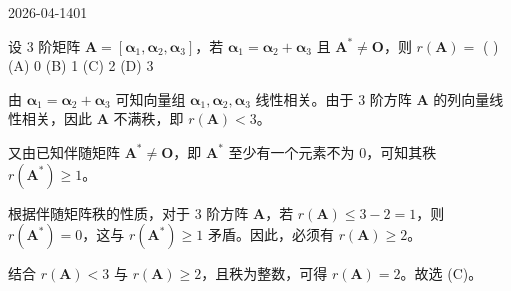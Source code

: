 \begin{mistake}{2026-04-14}{01}

\begin{problemcontent}
设 3 阶矩阵 \(\mathbf{A} = [\boldsymbol{\alpha}_1, \boldsymbol{\alpha}_2, \boldsymbol{\alpha}_3]\)，若 \(\boldsymbol{\alpha}_1 = \boldsymbol{\alpha}_2 + \boldsymbol{\alpha}_3\) 且 \(\mathbf{A}^* \neq \mathbf{O}\)，则 \(r(\mathbf{A}) =\) ( \quad )\\
(A) 0 \qquad (B) 1 \qquad (C) 2 \qquad (D) 3
\end{problemcontent}

\begin{solutioncontent}
由 \(\boldsymbol{\alpha}_1 = \boldsymbol{\alpha}_2 + \boldsymbol{\alpha}_3\) 可知向量组 \(\boldsymbol{\alpha}_1, \boldsymbol{\alpha}_2, \boldsymbol{\alpha}_3\) 线性相关。由于 3 阶方阵 \(\mathbf{A}\) 的列向量线性相关，因此 \(\mathbf{A}\) 不满秩，即 \(r(\mathbf{A}) < 3\)。

又由已知伴随矩阵 \(\mathbf{A}^* \neq \mathbf{O}\)，即 \(\mathbf{A}^*\) 至少有一个元素不为 0，可知其秩 \(r(\mathbf{A}^*) \ge 1\)。

根据伴随矩阵秩的性质，对于 3 阶方阵 \(\mathbf{A}\)，若 \(r(\mathbf{A}) \le 3-2=1\)，则 \(r(\mathbf{A}^*) = 0\)，这与 \(r(\mathbf{A}^*) \ge 1\) 矛盾。因此，必须有 \(r(\mathbf{A}) \ge 2\)。

结合 \(r(\mathbf{A}) < 3\) 与 \(r(\mathbf{A}) \ge 2\)，且秩为整数，可得 \(r(\mathbf{A}) = 2\)。故选 (C)。
\end{solutioncontent}


\end{mistake}
